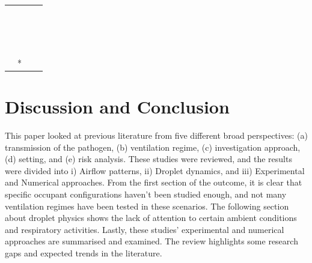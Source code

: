 \documentclass[a4paper,12pt]{elsarticle}
\begin{document}
\begin{longtable}{|m{3cm}|m{4.3cm}|m{4.4cm}|m{3.2cm}|}
     & \citet{liu2020full} &  &  \\
    
     & \citet{cheng2021experimental} &  &  \\
    
     & \citet{wang2022evaluation} &  &  \\
    
     & \citet{liu2023estimating} &  &  \\
    
     & \citet{wei2023effects} &  &  \\
    
     & \citet{li2021effects} &  &  \\
    
     & \citet{cortellessa2023effectiveness} &  &  \\
    
     & \citet{srivastava2021effective} &  &  \\

     & \citet{deng2021control} &  &  \\
   
     & \citet{xu2023cfd} &  &  \\
    
     & \citet{motamedi2022cfd} &  &  \\
    
     & \citet{arpino2023cfd} &  &  \\
    
     & \citet{pan2022boundary} &  &  \\
    
     & \citet{yang2021airborne} &  &  \\
     & \citet{sen2021transmission} &  &  \\
     & \citet{feng2020influence} &  &  \\
     & \citet{fontes2020study}* &  &  \\
    \hline
\end{longtable}

\section{Discussion and Conclusion}

This paper looked at previous literature from five different broad perspectives: (a) transmission of the pathogen, (b) ventilation regime, (c) investigation approach, (d) setting, and (e) risk analysis. These studies were reviewed, and the results were divided into i) Airflow patterns, ii) Droplet dynamics, and iii) Experimental and Numerical approaches. From the first section of the outcome, it is clear that specific occupant configurations haven't been studied enough, and not many ventilation regimes have been tested in these scenarios. The following section about droplet physics shows the lack of attention to certain ambient conditions and respiratory activities. Lastly, these studies' experimental and numerical approaches are summarised and examined. The review highlights some research gaps and expected trends in the literature.
\end{document}
